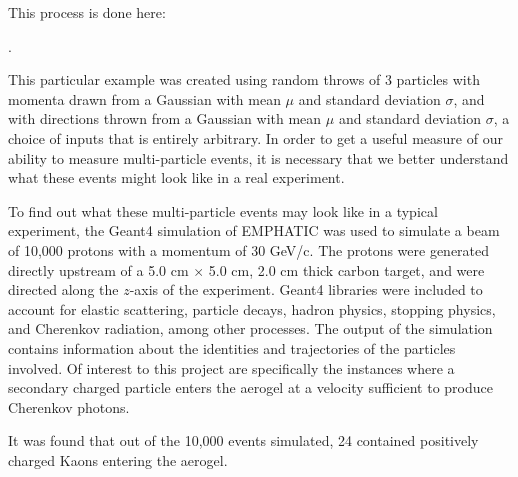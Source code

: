 This process is done here:

 .
 
This particular example was created using random throws of 3 particles with momenta drawn from a Gaussian with mean $\mu$ and standard deviation $\sigma$, and with directions thrown from a Gaussian with mean $\mu$ and standard deviation $\sigma$, a choice of inputs that is entirely arbitrary. 
In order to get a useful measure of our ability to measure multi-particle events, it is necessary that we better understand what these events might look like in a real experiment.

To find out what these multi-particle events may look like in a typical experiment, the Geant4 simulation of EMPHATIC was used to simulate a beam of 10,000 protons with a momentum of 30 GeV/c.
The protons were generated directly upstream of a 5.0 cm $\times$ 5.0 cm, 2.0 cm thick carbon target, and were directed along the $z$-axis of the experiment.
Geant4 libraries were included to account for elastic scattering, particle decays, hadron physics, stopping physics, and Cherenkov radiation, among other processes. 
The output of the simulation contains information about the identities and trajectories of the particles involved. 
Of interest to this project are specifically the instances where a secondary charged particle enters the aerogel at a velocity sufficient to produce Cherenkov photons.


It was found that out of the 10,000 events simulated, 24 contained positively charged Kaons entering the aerogel.

\endinput

Any text after an \endinput is ignored.
You could put scraps here or things in progress.

